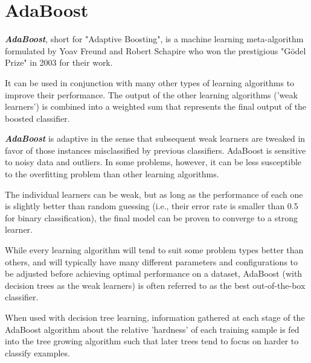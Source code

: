  \section{AdaBoost}
 
\textbf{\textit{AdaBoost}}, short for "Adaptive Boosting", is a machine learning meta-algorithm formulated by Yoav Freund and Robert Schapire who won the prestigious "Gödel Prize" in 2003 for their work. 

It can be used in conjunction with many other types of learning algorithms to improve their performance. The output of the other learning algorithms ('weak learners') is combined into a weighted sum that represents the final output of the boosted classifier. 

\textbf{\textit{AdaBoost}} is adaptive in the sense that subsequent weak learners are tweaked in favor of those instances misclassified by previous classifiers. AdaBoost is sensitive to noisy data and outliers. In some problems, however, it can be less susceptible to the overfitting problem than other learning algorithms. 

The individual learners can be weak, but as long as the performance of each one is slightly better than random guessing (i.e., their error rate is smaller than 0.5 for binary classification), the final model can be proven to converge to a strong learner.

While every learning algorithm will tend to suit some problem types better than others, and will typically have many different parameters and configurations to be adjusted before achieving optimal performance on a dataset, AdaBoost (with decision trees as the weak learners) is often referred to as the best out-of-the-box classifier. 

When used with decision tree learning, information gathered at each stage of the AdaBoost algorithm about the relative 'hardness' of each training sample is fed into the tree growing algorithm such that later trees tend to focus on harder to classify examples.

